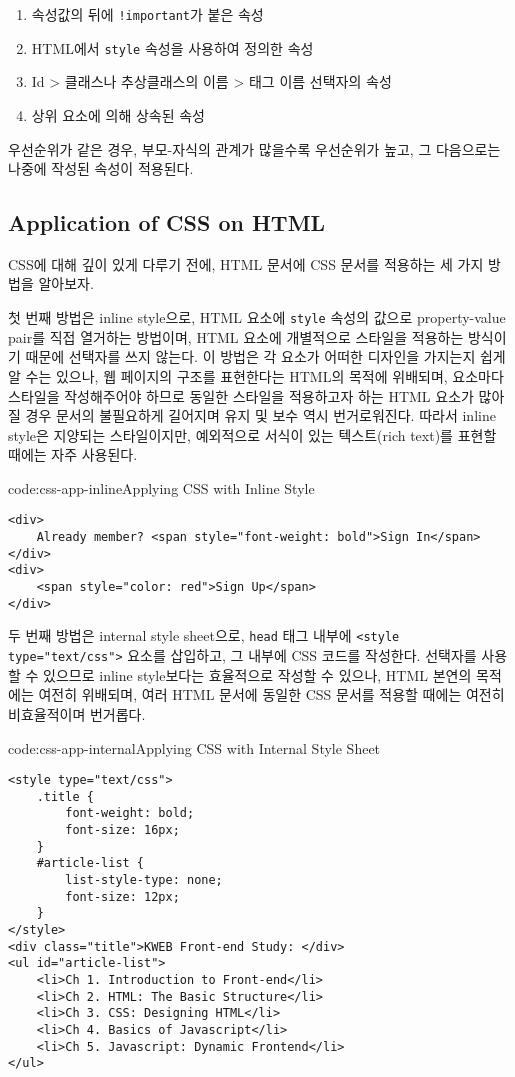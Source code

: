 \begin{enumerate}
    \item 속성값의 뒤에 \texttt{!important}가 붙은 속성
    \item HTML에서 \texttt{style} 속성을 사용하여 정의한 속성
    \item Id {\textgreater} 클래스나 추상클래스의 이름 {\textgreater} 태그 이름 선택자의 속성
    \item 상위 요소에 의해 상속된 속성
\end{enumerate}

우선순위가 같은 경우, 부모-자식의 관계가 많을수록 우선순위가 높고, 그 다음으로는 나중에 작성된 속성이 적용된다.

\subsection*{Application of CSS on HTML}
CSS에 대해 깊이 있게 다루기 전에, HTML 문서에 CSS 문서를 적용하는 세 가지 방법을 알아보자.

첫 번째 방법은 inline style으로, HTML 요소에 \texttt{style} 속성의 값으로 property-value pair를 직접 열거하는 방법이며, HTML 요소에 개별적으로 스타일을 적용하는 방식이기 때문에 선택자를 쓰지 않는다. 이 방법은 각 요소가 어떠한 디자인을 가지는지 쉽게 알 수는 있으나, 웹 페이지의 구조를 표현한다는 HTML의 목적에 위배되며, 요소마다 스타일을 작성해주어야 하므로 동일한 스타일을 적용하고자 하는 HTML 요소가 많아질 경우 문서의 불필요하게 길어지며 유지 및 보수 역시 번거로워진다. 따라서 inline style은 지양되는 스타일이지만, 예외적으로 서식이 있는 텍스트(rich text)를 표현할 때에는 자주 사용된다.

\begin{codeenv}{code:css-app-inline}{Applying CSS with Inline Style}\begin{verbatim}
<div>
    Already member? <span style="font-weight: bold">Sign In</span>
</div>
<div>
    <span style="color: red">Sign Up</span>
</div>
\end{verbatim}
\end{codeenv}

두 번째 방법은 internal style sheet으로, \texttt{head} 태그 내부에 \texttt{<style type="text/css">} 요소를 삽입하고, 그 내부에 CSS 코드를 작성한다. 선택자를 사용할 수 있으므로 inline style보다는 효율적으로 작성할 수 있으나, HTML 본연의 목적에는 여전히 위배되며, 여러 HTML 문서에 동일한 CSS 문서를 적용할 때에는 여전히 비효율적이며 번거롭다.

\begin{codeenv}{code:css-app-internal}{Applying CSS with Internal Style Sheet}\begin{verbatim}
<style type="text/css">
    .title {
        font-weight: bold;
        font-size: 16px;
    }
    #article-list {
        list-style-type: none;
        font-size: 12px;
    }
</style>
<div class="title">KWEB Front-end Study: </div>
<ul id="article-list">
    <li>Ch 1. Introduction to Front-end</li>
    <li>Ch 2. HTML: The Basic Structure</li>
    <li>Ch 3. CSS: Designing HTML</li>
    <li>Ch 4. Basics of Javascript</li>
    <li>Ch 5. Javascript: Dynamic Frontend</li>
</ul>
\end{verbatim}
\end{codeenv}
\newpage

